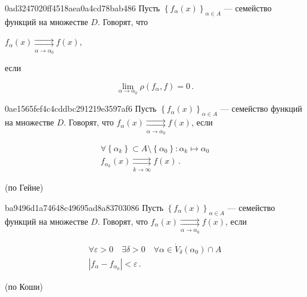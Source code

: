 \begin{note}{0ad3247020ff4518aea0a4cd78bab486}
    Пусть \({ \left\{ f_\alpha (x) \right\}_{\alpha \in A} }\) --- семейство функций на множестве \({ D }\).
    Говорят, что \begin{icloze}{2}\({ f_{\alpha}(x) \underset{\alpha \to \alpha_0}{\rightrightarrows} f(x) }\),\end{icloze} если
    \begin{icloze}{1}
        \[
            \lim_{\alpha \to \alpha_0} \rho(f_\alpha, f) = 0\,.
        \]
    \end{icloze}
\end{note}

\begin{note}{0ae1565fef4c4cddbc291219e3597af6}
    Пусть \({ \left\{ f_\alpha (x) \right\}_{\alpha \in A} }\) --- семейство функций на множестве \({ D }\).
    Говорят, что \({ f_{\alpha}(x) \underset{\alpha \to \alpha_0}{\rightrightarrows} f(x) }\), если
    \begin{icloze}{1}
        \[
            \begin{gathered}
                \forall \left\{ \alpha_k \right\} \subset A \setminus \left\{ \alpha_0 \right\} : \alpha_k \mapsto \alpha_0 \\
                f_{\alpha_k}(x) \underset{k \to \infty}{\rightrightarrows} f(x)\,.
            \end{gathered}
        \]
    \end{icloze}

    \begin{center}
        \tiny
        (по Гейне)
    \end{center}
\end{note}

\begin{note}{ba9496d1a74648c49695ad8a83703086}
    Пусть \({ \left\{ f_\alpha (x) \right\}_{\alpha \in A} }\) --- семейство функций на множестве \({ D }\).
    Говорят, что \({ f_{\alpha}(x) \underset{\alpha \to \alpha_0}{\rightrightarrows} f(x) }\), если
    \begin{icloze}{1}
        \[
            \begin{gathered}
                \forall \varepsilon > 0 \quad \exists \delta > 0 \quad \forall \alpha \in \dot V_{\delta}(\alpha_0) \cap A \\
                \left\lvert f_\alpha - f_{\alpha_0} \right\rvert < \varepsilon\,.
            \end{gathered}
        \]
    \end{icloze}

    \begin{center}
        \tiny
        (по Коши)
    \end{center}
\end{note}

